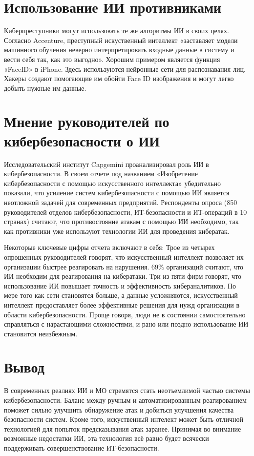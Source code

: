 \documentclass{article}
\begin{document}
\section*{Использование ИИ противниками}

Киберпреступники могут использовать те же алгоритмы ИИ в своих целях. Согласно Accenture, преступный искуственный интеллект «заставляет модели машинного обучения неверно интерпретировать входные данные в систему и вести себя так, как это выгодно».
Хорошим примером является функция «FaceID» в iPhone. Здесь используются нейронные сети для распознавания лиц. Хакеры создают помогающие им обойти Face ID изображения и могут легко добыть нужные им данные.

\section*{Мнение руководителей по кибербезопасности о ИИ}

Исследовательский институт Capgemini проанализировал роль ИИ в кибербезопасности. В своем отчете под названием «Изобретение кибербезопасности с помощью искусственного интеллекта» убедительно показали, что усиление систем кибербезопасности с помощью ИИ является неотложной задачей для современных предприятий.
Респонденты опроса (850 руководителей отделов кибербезопасности, ИТ-безопасности и ИТ-операций в 10 странах) считают, что противостояние атакам с помощью ИИ необходимо, так как противники уже используют технологии ИИ для проведения кибератак.

Некоторые ключевые цифры отчета включают в себя:
Трое из четырех опрошенных руководителей говорят, что искусственный интеллект позволяет их организации быстрее реагировать на нарушения.
69\% организаций считают, что ИИ необходим для реагирования на кибератаки.
Три из пяти фирм говорят, что использование ИИ повышает точность и эффективность кибераналитиков.
По мере того как сети становятся больше, а данные усложняются, искусственный интеллект предоставляет более эффективные решения для нужд организации в области кибербезопасности. Проще говоря, люди не в состоянии самостоятельно справляться с нарастающими сложностями, и рано или поздно использование ИИ становится неизбежным.

\newpage
\section*{Вывод}
В современных реалиях ИИ и МО стремятся стать неотъемлимой частью системы кибербезопасности. Баланс между ручным и автоматизированным реагированием поможет сильно улучшить обнаружение атак и добиться улучшения качества безопасности систем. Кроме того, искуственный интелект может быть отличной технологией для попыток предсказывания атак заранее.
Принимая во внимание возможные недостатки ИИ, эта технология всё равно будет всячески поддерживать совершенствование ИТ-безопасности.
\end{document}
